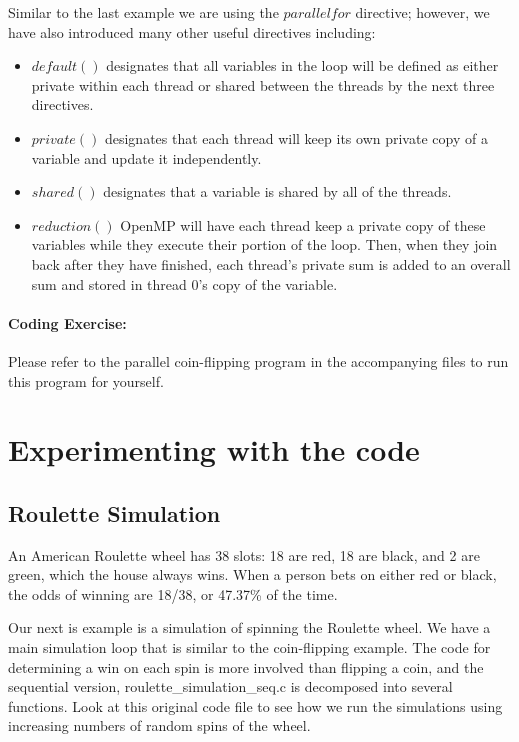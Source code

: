 \documentclass[a4paper, 11pt]{article}
\begin{document}
Similar to the last example we are using the $parallel for$ directive; however, we have also introduced many other useful directives including:

\begin{itemize}
\item $default()$ designates that all variables in the loop will be defined as either private within each thread or shared between the threads by the next three directives.

\item $private()$ designates that each thread will keep its own private copy of a variable and update it independently.

\item $shared()$ designates that a variable is shared by all of the threads.

\item $reduction()$ OpenMP will have each thread keep a private copy of these variables while they execute their portion of the loop. Then, when they join back after they have finished, each thread's private sum is added to an overall sum and stored in thread 0's copy of the variable.
\end{itemize}

\paragraph{Coding Exercise:}
Please refer to the parallel coin-flipping program in the accompanying files to run this program for yourself.

\pagebreak
\section{Experimenting with the code}

\subsection{Roulette Simulation}

An American Roulette wheel has 38 slots: 18 are red, 18 are black, and 2 are green, which the house always wins. When a person bets on either red or black, the odds of winning are 18/38, or 47.37\% of the time.

Our next is example is a simulation of spinning the Roulette wheel. We have a main simulation loop that is similar to the coin-flipping example. The code for determining a win on each spin is more involved than flipping a coin, and the sequential version, roulette\_simulation\_seq.c is decomposed into several functions. Look at this original code file to see how we run the simulations using increasing numbers of random spins of the wheel.
\end{document}
